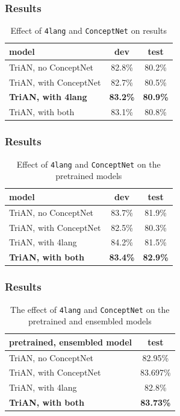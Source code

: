\documentclass[bigger]{beamer}
\begin{document}
\begin{frame}
	\frametitle{Results}
	\begin{table}[!h]
		\centering
		\begin{tabular}{ | l | c | c | }
			\hline
			model & dev & test \\ \hline \hline
			TriAN, no ConceptNet & 82.8\% & 80.2\% \\ \hline
			TriAN, with ConceptNet & 82.7\% & 80.5\% \\ \hline
			\textbf{TriAN, with 4lang} & \textbf{83.2\%} & \textbf{80.9\%} \\ \hline
			TriAN, with both & 83.1\% & 80.8\% \\ \hline
		\end{tabular}
		\caption{Effect of \texttt{4lang} and \texttt{ConceptNet} on results}
		\label{tabl:res}
	\end{table}
\end{frame}

\begin{frame}
	\frametitle{Results}
	\begin{table}[!h]
		\centering
		\begin{tabular}{| l | c | c |}
			\hline
			model & dev & test \\ \hline \hline
			TriAN, no ConceptNet & 83.7\% & 81.9\% \\ \hline
			TriAN, with ConceptNet & 82.5\% & 80.3\% \\ \hline
			TriAN, with 4lang & 84.2\% & 81.5\% \\ \hline
			\textbf{TriAN, with both} & \textbf{83.4\%} & \textbf{82.9\%} \\ \hline
		\end{tabular}
		\caption{Effect of \texttt{4lang} and \texttt{ConceptNet} on the pretrained models}
		\label{tabl:pretrained}
	\end{table}
\end{frame}

\begin{frame}
	\frametitle{Results}
	\begin{table}[!h]
		\centering
		\begin{tabular}{ | l | c | }
			\hline
			pretrained, ensembled model & test \\ \hline \hline
			TriAN, no ConceptNet & 82.95\% \\ \hline
			TriAN, with ConceptNet &  83.697\% \\ \hline
			TriAN, with 4lang & 82.8\% \\ \hline
			\textbf{TriAN, with both} & \textbf{83.73\%} \\ \hline
		\end{tabular}
		\caption{The effect of \texttt{4lang} and \texttt{ConceptNet} on the pretrained and ensembled models}
		\label{tabl:pretrained_ensembled}
	\end{table}
\end{frame}
\end{document}

